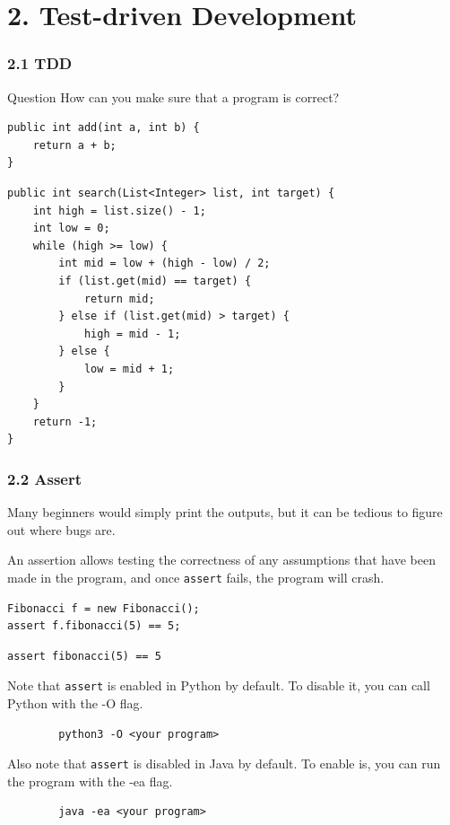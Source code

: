 \documentclass[aspectratio=169, 14pt]{beamer}
\begin{document}
\section{\textcolor{darkmidnightblue}{2. Test-driven Development}}
\begin{frame}[fragile]
    \frametitle{2.1 TDD}
    \begin{exampleblock}{Question}
    How can you make sure that a program is correct?
    \end{exampleblock}
    \begin{verbatim}
public int add(int a, int b) {
    return a + b;
} 
    \end{verbatim} 
\end{frame}

\begin{frame}[fragile]
    \begin{verbatim}
public int search(List<Integer> list, int target) {
    int high = list.size() - 1;
    int low = 0;
    while (high >= low) {
        int mid = low + (high - low) / 2;
        if (list.get(mid) == target) {
            return mid;
        } else if (list.get(mid) > target) {
            high = mid - 1;
        } else {
            low = mid + 1;
        }
    }
    return -1;
}
    \end{verbatim} 
\end{frame}

\begin{frame}[fragile]
    \frametitle{2.2 Assert}
    Many beginners would simply print the outputs, but it can be tedious to figure out where bugs are.

\pause
An \alert{assertion} allows testing the correctness of any assumptions that have been made in the program, and once \texttt{assert} fails, the program will crash. 

\begin{verbatim}
Fibonacci f = new Fibonacci();
assert f.fibonacci(5) == 5;
\end{verbatim}

\begin{verbatim}
assert fibonacci(5) == 5
\end{verbatim}

\end{frame}

\begin{frame}[fragile=singleslide]
    Note that \texttt{assert} is enabled in Python by default. To disable it, you can call Python with the \alert{-O} flag.

    \begin{verbatim}
        python3 -O <your program>
    \end{verbatim}

    Also note that \texttt{assert} is disabled in Java by default. To enable is, you can run the program with the \alert{-ea} flag.

    \begin{verbatim}
        java -ea <your program>
    \end{verbatim} 
\end{frame}
\end{document}
